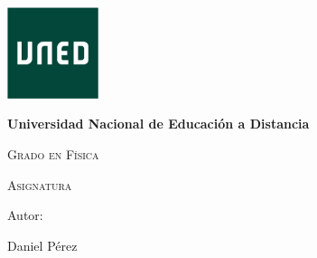 \documentclass[12pt]{report}
\begin{document}
\begin{titlepage}
\centering
{\includegraphics[width=0.2\textwidth]{etc/UNED.jpg}\par}
\vspace{1cm}
{\bfseries\LARGE Universidad Nacional de Educación a Distancia \par}
\vspace{1cm}
{\scshape\Large Grado en Física \par}
\vspace{3cm}
{\scshape\Huge Asignatura \par}
\vspace{3cm}
\vfill
{\Large Autor: \par}
{\Large Daniel Pérez \par}
\vfill
\end{titlepage}

    \begingroup
        \hypersetup{linkcolor=black}
        \tableofcontents
    \endgroup
    \clearpage{}
    
\end{document}
